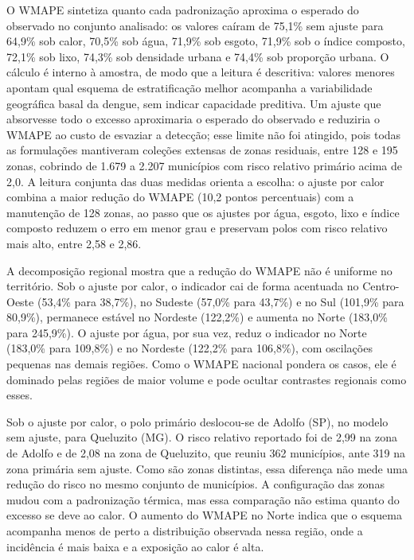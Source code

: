 O WMAPE sintetiza quanto cada padronização aproxima o esperado do observado no conjunto analisado: os valores caíram de 75,1\% sem ajuste para 64,9\% sob calor, 70,5\% sob água, 71,9\% sob esgoto, 71,9\% sob o índice composto, 72,1\% sob lixo, 74,3\% sob densidade urbana e 74,4\% sob proporção urbana. O cálculo é interno à amostra, de modo que a leitura é descritiva: valores menores apontam qual esquema de estratificação melhor acompanha a variabilidade geográfica basal da dengue, sem indicar capacidade preditiva. Um ajuste que absorvesse todo o excesso aproximaria o esperado do observado e reduziria o WMAPE ao custo de esvaziar a detecção; esse limite não foi atingido, pois todas as formulações mantiveram coleções extensas de zonas residuais, entre 128 e 195 zonas, cobrindo de 1.679 a 2.207 municípios com risco relativo primário acima de 2,0. A leitura conjunta das duas medidas orienta a escolha: o ajuste por calor combina a maior redução do WMAPE (10,2 pontos percentuais) com a manutenção de 128 zonas, ao passo que os ajustes por água, esgoto, lixo e índice composto reduzem o erro em menor grau e preservam polos com risco relativo mais alto, entre 2,58 e 2,86.

A decomposição regional mostra que a redução do WMAPE não é uniforme no território. Sob o ajuste por calor, o indicador cai de forma acentuada no Centro-Oeste (53,4\% para 38,7\%), no Sudeste (57,0\% para 43,7\%) e no Sul (101,9\% para 80,9\%), permanece estável no Nordeste (122,2\%) e aumenta no Norte (183,0\% para 245,9\%). O ajuste por água, por sua vez, reduz o indicador no Norte (183,0\% para 109,8\%) e no Nordeste (122,2\% para 106,8\%), com oscilações pequenas nas demais regiões. Como o WMAPE nacional pondera os casos, ele é dominado pelas regiões de maior volume e pode ocultar contrastes regionais como esses.

Sob o ajuste por calor, o polo primário deslocou-se de Adolfo (SP), no modelo sem ajuste, para Queluzito (MG). O risco relativo reportado foi de 2,99 na zona de Adolfo e de 2,08 na zona de Queluzito, que reuniu 362 municípios, ante 319 na zona primária sem ajuste. Como são zonas distintas, essa diferença não mede uma redução do risco no mesmo conjunto de municípios. A configuração das zonas mudou com a padronização térmica, mas essa comparação não estima quanto do excesso se deve ao calor. O aumento do WMAPE no Norte indica que o esquema acompanha menos de perto a distribuição observada nessa região, onde a incidência é mais baixa e a exposição ao calor é alta.

